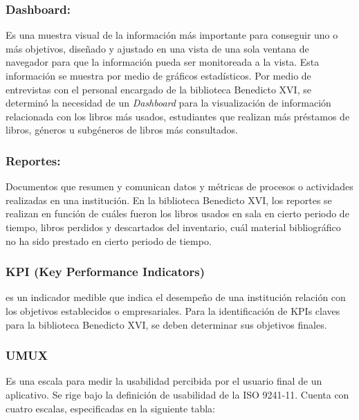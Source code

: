\documentclass[spanish]{ieee_upb}
\begin{document}
  \subsubsection{Dashboard: } Es una muestra visual de la información más importante para conseguir uno o más objetivos, diseñado y ajustado en una vista de una sola ventana de navegador para que la información pueda ser monitoreada a la vista. Esta información se muestra por medio de gráficos estadísticos\cite{few2006information}. Por medio de entrevistas con el personal encargado de la biblioteca Benedicto XVI, se determinó la necesidad de un \textit{Dashboard} para la visualización de información relacionada con los libros más usados, estudiantes que realizan más préstamos de libros, géneros u subgéneros de libros más consultados.  

  \subsubsection{Reportes: }Documentos que resumen y comunican datos y métricas de procesos o actividades realizadas en una institución\cite{ibm_reports_2018}. En la biblioteca Benedicto XVI, los reportes se realizan en función de cuáles fueron los libros usados en sala en cierto periodo de tiempo, libros perdidos y descartados del inventario, cuál material bibliográfico no ha sido prestado en cierto periodo de tiempo.

    \subsubsection{KPI (Key Performance Indicators)} es un indicador medible que indica el desempeño de una institución relación con los objetivos establecidos o empresariales\cite{marr2012key}. Para la identificación de KPIs claves para la biblioteca Benedicto XVI, se deben determinar sus objetivos finales. 
    
  \subsubsection{UMUX} Es una escala para medir la usabilidad percibida por el usuario final de un aplicativo. Se rige bajo la definición de usabilidad de la ISO 9241-11\cite{finstad2010usabilityUMUX}. Cuenta con cuatro escalas, especificadas en la siguiente tabla: 
\end{document}
